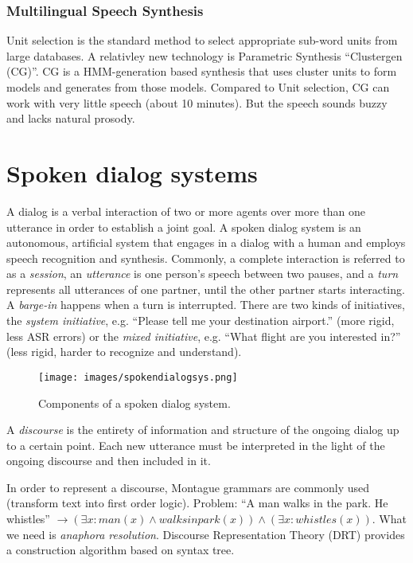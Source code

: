 \subsubsection{Multilingual Speech Synthesis}
Unit selection is the standard method to select appropriate sub-word units from large databases. A relativley new technology is Parametric Synthesis ``Clustergen (CG)''. CG is a HMM-generation based synthesis that uses cluster units to form models and generates from those models.
Compared to Unit selection, CG can work with very little speech (about 10 minutes). But the speech sounds buzzy and lacks natural prosody.

\newpage

\section{Spoken dialog systems}

A dialog is a verbal interaction of two or more agents over more than one utterance in order to establish a joint goal. A spoken dialog system is an autonomous, artificial system that engages in a dialog with a human and employs speech recognition and synthesis. Commonly, a complete interaction is referred to as a \textit{session}, an \textit{utterance} is one person's speech between two pauses, and a \textit{turn} represents all utterances of one partner, until the other partner starts interacting. A \textit{barge-in} happens when a turn is interrupted.
There are two kinds of initiatives, the \textit{system initiative}, e.g. ``Please tell me your destination airport.'' (more rigid, less ASR errors) or the \textit{mixed initiative}, e.g. ``What flight are you interested in?'' (less rigid, harder to recognize and understand).

\begin{figure}[htb]
\centering
\texttt{[image: images/spokendialogsys.png]}
\caption{\label{figureA} Components of a spoken dialog system.}
\end{figure}

A \textit{discourse} is the entirety of information and structure of the ongoing dialog up to a certain point. Each new utterance must be interpreted in the light of the ongoing discourse and then included in it.

\vspace{5pt}

In order to represent a discourse, Montague grammars are commonly used (transform text into first order logic). Problem: ``A man walks in the park. He whistles'' $\rightarrow (\exists x : man(x) \wedge walksinpark(x)) \wedge (\exists x : whistles(x))$. What we need is \textit{anaphora resolution}. Discourse Representation Theory (DRT) provides a construction algorithm based on syntax tree.

